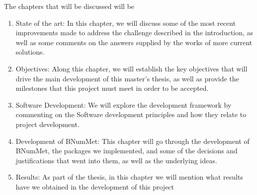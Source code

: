 The chapters that will be discussed will be
\begin{enumerate}
    \item State of the art:
    In this chapter, we will discuss some of the most recent improvements made to address the challenge described in the introduction, as well as some comments on the answers supplied by the works of more current solutions.

        
    \item Objectives: 
    Along this chapter, we will establish the key objectives that will drive the main development of this master's thesis, as well as provide the milestones that this project must meet in order to be accepted.

    
    
    \item Software Development:
    We will explore the development framework by commenting on the Software development principles and how they relate to project development.


    \item Development of BNumMet:
    This chapter will go through the development of BNumMet, the packages we implemented, and some of the decisions and justifications that went into them, as well as the underlying ideas.


        
    \item Results:
    As part of the thesis, in this chapter we will mention what results have we obtained in the development of this project
    

\end{enumerate}